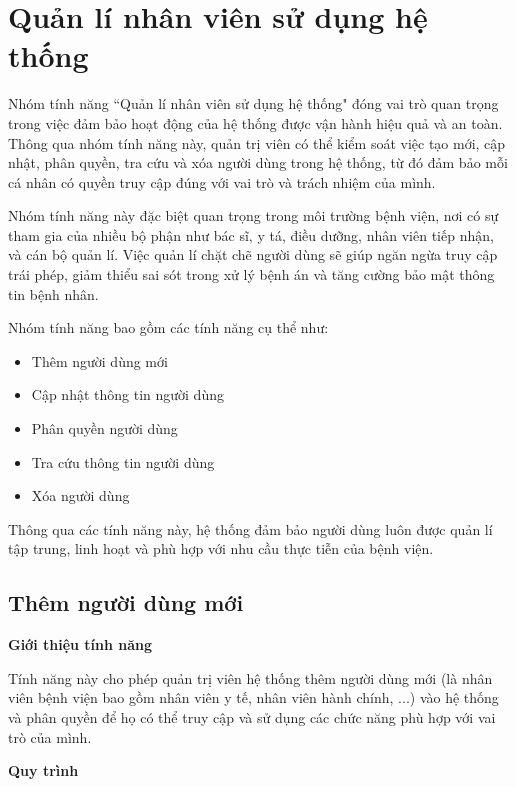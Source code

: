 \section{Quản lí nhân viên sử dụng hệ thống}

Nhóm tính năng ``Quản lí nhân viên sử dụng hệ thống" đóng vai trò quan trọng trong việc đảm bảo hoạt động của hệ thống được vận hành hiệu quả và an toàn. Thông qua nhóm tính năng này, quản trị viên có thể kiểm soát việc tạo mới, cập nhật, phân quyền, tra cứu và xóa người dùng trong hệ thống, từ đó đảm bảo mỗi cá nhân có quyền truy cập đúng với vai trò và trách nhiệm của mình.

Nhóm tính năng này đặc biệt quan trọng trong môi trường bệnh viện, nơi có sự tham gia của nhiều bộ phận như bác sĩ, y tá, điều dưỡng, nhân viên tiếp nhận, và cán bộ quản lí. Việc quản lí chặt chẽ người dùng sẽ giúp ngăn ngừa truy cập trái phép, giảm thiểu sai sót trong xử lý bệnh án và tăng cường bảo mật thông tin bệnh nhân.

Nhóm tính năng bao gồm các tính năng cụ thể như:

\begin{itemize}
  \item Thêm người dùng mới
  \item Cập nhật thông tin người dùng
  \item Phân quyền người dùng
  \item Tra cứu thông tin người dùng
  \item Xóa người dùng
\end{itemize}

Thông qua các tính năng này, hệ thống đảm bảo người dùng luôn được quản lí tập trung, linh hoạt và phù hợp với nhu cầu thực tiễn của bệnh viện.

\subsection{Thêm người dùng mới}

\noindent \textbf{Giới thiệu tính năng}

Tính năng này cho phép quản trị viên hệ thống thêm người dùng mới (là nhân viên bệnh viện bao gồm nhân viên y tế, nhân viên hành chính, ...) vào hệ thống và phân quyền để họ có thể truy cập và sử dụng các chức năng phù hợp với vai trò của mình.

\noindent \textbf{Quy trình}

